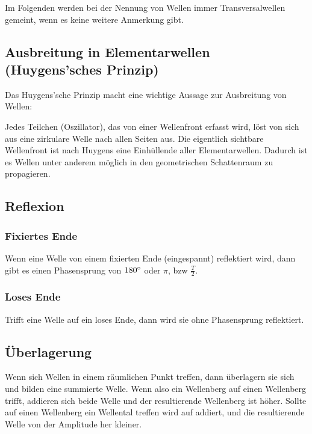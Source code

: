Im Folgenden werden bei der Nennung von \glqq Wellen\grqq{} immer Transversalwellen gemeint, wenn es keine weitere Anmerkung gibt.  


\subsection[Ausbreitung in Elementarwellen]{Ausbreitung in Elementarwellen (Huygens'sches Prinzip)} \label{subsec:ausbreitung}

Das Huygens'sche Prinzip macht eine wichtige Aussage zur Ausbreitung von Wellen:

\glqq Jedes Teilchen (Oszillator), das von einer Wellenfront erfasst wird, löst von sich aus eine zirkulare Welle nach allen Seiten aus.\grqq{} Die eigentlich sichtbare Wellenfront ist nach Huygens eine Einhüllende aller \glqq Elementarwellen\grqq . Dadurch ist es Wellen unter anderem möglich in den geometrischen Schattenraum zu propagieren. 


\subsection{Reflexion}  
	\subsubsection{Fixiertes Ende}
	
	Wenn eine Welle von einem fixierten Ende (eingespannt) reflektiert wird, dann gibt es einen Phasensprung von $180 \degree$ oder $\pi$, bzw $\frac{T}{2}$.
	
	\subsubsection{Loses Ende}
	
	Trifft eine Welle auf ein loses Ende, dann wird sie ohne Phasensprung reflektiert.



\subsection{Überlagerung} \label{subsec:ueberlagerung}

Wenn sich Wellen in einem räumlichen Punkt treffen, dann überlagern sie sich und bilden eine summierte Welle. Wenn also ein Wellenberg auf einen Wellenberg trifft, addieren sich beide Welle und der resultierende Wellenberg ist höher. Sollte auf einen Wellenberg ein Wellental treffen wird auf addiert, und die resultierende Welle von der Amplitude her kleiner.


